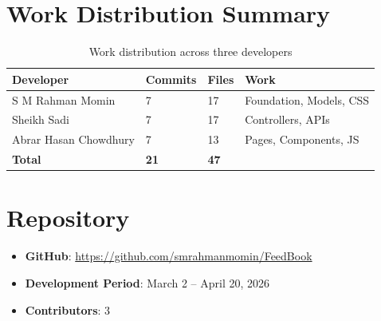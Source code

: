 \documentclass[12pt,a4paper]{report}
\begin{document}
\section{Work Distribution Summary}

\begin{table}[h]
\centering
\begin{tabular}{l l l l}
\toprule
\textbf{Developer} & \textbf{Commits} & \textbf{Files} & \textbf{Work} \\
\midrule
S M Rahman Momin & 7 & 17 & Foundation, Models, CSS \\
Sheikh Sadi & 7 & 17 & Controllers, APIs \\
Abrar Hasan Chowdhury & 7 & 13 & Pages, Components, JS \\
\midrule
\textbf{Total} & \textbf{21} & \textbf{47} & \\
\bottomrule
\end{tabular}
\caption{Work distribution across three developers}
\end{table}

\section{Repository}
\begin{itemize}
    \item \textbf{GitHub}: \url{https://github.com/smrahmanmomin/FeedBook}
    \item \textbf{Development Period}: March 2 -- April 20, 2026
    \item \textbf{Contributors}: 3
\end{itemize}
\end{document}
